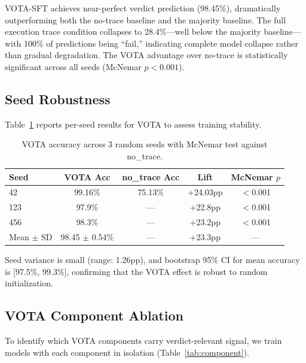 \documentclass[11pt]{article}
\begin{document}
VOTA-SFT achieves near-perfect verdict prediction (98.45\%), dramatically outperforming both the no-trace baseline and the majority baseline. The full execution trace condition collapses to 28.4\%---well below the majority baseline---with 100\% of predictions being ``fail,'' indicating complete model collapse rather than gradual degradation. The VOTA advantage over no-trace is statistically significant across all seeds (McNemar $p < 0.001$).

\subsection{Seed Robustness}
\label{sec:seed}

Table~\ref{tab:seed} reports per-seed results for VOTA to assess training stability.

\begin{table}[h]
\centering
\caption{VOTA accuracy across 3 random seeds with McNemar test against no\_trace.}
\label{tab:seed}
\begin{tabular}{lcccc}
\toprule
\textbf{Seed} & \textbf{VOTA Acc} & \textbf{no\_trace Acc} & \textbf{Lift} & \textbf{McNemar $p$} \\
\midrule
42  & 99.16\% & 75.13\% & +24.03pp & $<$0.001 \\
123 & 97.9\%  & ---     & +22.8pp  & $<$0.001 \\
456 & 98.3\%  & ---     & +23.2pp  & $<$0.001 \\
\midrule
Mean $\pm$ SD & 98.45 $\pm$ 0.54\% & --- & +23.3pp & --- \\
\bottomrule
\end{tabular}
\end{table}

Seed variance is small (range: 1.26pp), and bootstrap 95\% CI for mean accuracy is [97.5\%, 99.3\%], confirming that the VOTA effect is robust to random initialization.

\subsection{VOTA Component Ablation}
\label{sec:component}

To identify which VOTA components carry verdict-relevant signal, we train models with each component in isolation (Table~\ref{tab:component}).
\end{document}

